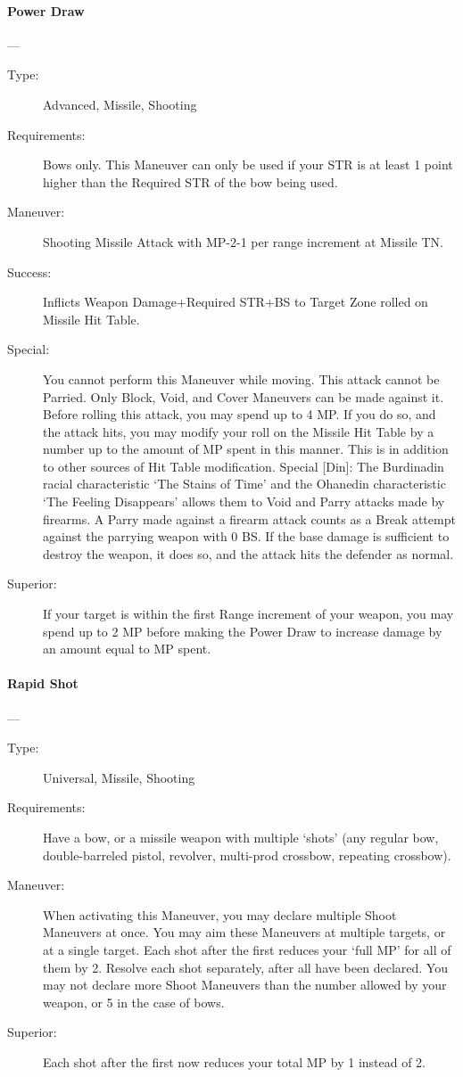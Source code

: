 \documentclass[oneside,11pt,english]{book}
\begin{document}
\paragraph{\large\label{man:Power Draw}Power Draw}---\quad{\large[???????]}
\vspace{-10pt}\begin{description} 
\item [Type:] Advanced, Missile, Shooting 
\item [Requirements:] Bows only. This Maneuver can only be used if your STR is at least 1 point higher than 
  the Required STR of the bow being used. 
\item [Maneuver:] Shooting Missile Attack with MP-2-1 per range increment at Missile TN. 
\item [Success:] Inflicts Weapon Damage+Required STR+BS to Target Zone rolled on Missile Hit Table. 
\item [Special:] You cannot perform this Maneuver while moving. 
  This attack cannot be Parried. Only Block, Void, and Cover Maneuvers can be made against it. 
  Before rolling this attack, you may spend up to 4 MP. If you do so, and the attack hits, you may modify 
  your roll on the Missile Hit Table by a number up to the amount of MP spent in this manner. This is in 
  addition to other sources of Hit Table modification. 
  Special [Din]: The Burdinadin racial characteristic ‘The Stains of Time’ and the Ohanedin characteristic 
  ‘The Feeling Disappears’ allows them to Void and Parry attacks made by firearms. A Parry made against 
  a firearm attack counts as a Break attempt against the parrying weapon with 0 BS. If the base damage is 
  sufficient to destroy the weapon, it does so, and the attack hits the defender as normal. 
\item [Superior:] If your target is within the first Range increment of your weapon, you may spend up to 2 MP 
  before making the Power Draw to increase damage by an amount equal to MP spent. 
\end{description}
\paragraph{\large\label{man:Rapid Shot}Rapid Shot}---\quad{\large[???????]}
\vspace{-10pt}\begin{description} 
\item [Type:] Universal, Missile, Shooting 
\item [Requirements:] Have a bow, or a missile weapon with multiple ‘shots’ (any regular bow, double-barreled 
  pistol, revolver, multi-prod crossbow, repeating crossbow). 
\item [Maneuver:] When activating this Maneuver, you may declare multiple Shoot Maneuvers at once. You 
  may aim these Maneuvers at multiple targets, or at a single target. Each shot after the first reduces your 
  ‘full MP’ for all of them by 2. Resolve each shot separately, after all have been declared. You may not 
  declare more Shoot Maneuvers than the number allowed by your weapon, or 5 in the case of bows. 
\item [Superior:] Each shot after the first now reduces your total MP by 1 instead of 2. 
\end{description}
\end{document}

